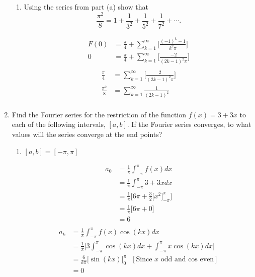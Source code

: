 \documentclass{article}
\begin{document}
\begin{enumerate}
\begin{enumerate}
\item Using the series from part (a) show that 
\[
\frac{\pi^2}{8} = 1 + \frac{1}{3^2} + \frac{1}{5^2} + \frac{1}{7^2} + \cdots .
\]

\begin{multicols}{2}
\noindent
\begin{align*}
        F(0) &= \frac{\pi}{4} + \sum^{\infty}_{k=1}\Bigg[ \frac{(-1)^k-1}{k^2\pi} \Bigg] \\ 
        0 &= \frac{\pi}{4} + \sum^{\infty}_{k=1}\Bigg[ \frac{-2}{(2k - 1)^2\pi} \Bigg] \\
        \end{align*}
        \begin{align*}
         \frac{\pi}{4} &= \sum^{\infty}_{k=1}\Bigg[ \frac{2}{(2k - 1)^2\pi} \Bigg] \\
         \frac{\pi^2}{8} &= \sum^{\infty}_{k=1} \frac{1}{(2k - 1)^2} \\
\end{align*}
\end{multicols}
\end{enumerate}
\newpage
\item Find the Fourier series for the restriction of the function $f(x) = 3 + 3x$ to each of the following intervals, $[a,b]$. If the Fourier series converges, to what values will the series converge at the end points?
\begin{enumerate}
\item $[a,b] = [-\pi, \pi] $
\begin{multicols}{2}
\noindent
\begin{align*}
    a_0 &= \frac{1}{\pi} \int_{-\pi}^{\pi}f(x) dx \\
    &= \frac{1}{\pi} \int_{-\pi}^{\pi}3 + 3x dx \\
    &= \frac{1}{\pi} \Bigg[6\pi +  \frac{3}{2}\Big[x^2\Big]^{\pi}_{-\pi}\Bigg] \\
    &= \frac{1}{\pi} \Bigg[6\pi + 0 \Bigg] \\
    &= 6\\
\end{align*}
\begin{align*}
    a_k &= \frac{1}{\pi} \int_{-\pi}^{\pi}f(x)\cos(kx) dx \\
    &= \frac{1}{\pi}\Bigg[ 3\int_{-\pi}^{\pi}\cos(kx) dx + \int_{-\pi}^{\pi}x\cos(kx) dx \Bigg] \\
    &= \frac{6}{k\pi}\Big[\sin(kx)\Big]_{0}^{\pi} \: \: \: [\text{Since $x$ odd and cos even}] \\
    &= 0
\end{align*}

\end{multicols}
\end{enumerate}
\end{enumerate}
\end{document}
